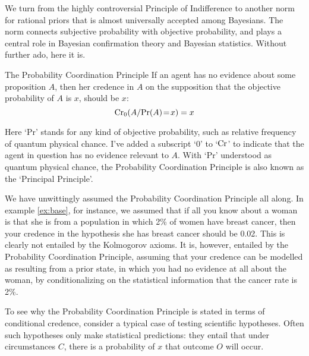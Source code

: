 
We turn from the highly controversial Principle of Indifference to
another norm for rational priors that is almost universally accepted
among Bayesians. The norm connects subjective probability with
objective probability, and plays a central role in Bayesian
confirmation theory and Bayesian statistics. Without further ado, here
it is.

\begin{genericthm}{The Probability Coordination Principle}
  If an agent has no evidence about some proposition $A$, then her
  credence in $A$ on the supposition that the objective probability of
  $A$ is $x$, should be $x$:
  \[
    \text{Cr}_0(A / \text{Pr}(A)\!=\!x) = x
  \]
\end{genericthm}
%
Here `Pr' stands for any kind of objective probability, such as
relative frequency of quantum physical chance. I've added a subscript
`0' to `$\text{Cr}$' to indicate that the agent in question has no evidence
relevant to $A$. With `Pr' understood as quantum physical chance, the
Probability Coordination Principle is also known as the `Principal
Principle'.

We have unwittingly assumed the Probability Coordination Principle all
along. In example \ref{ex:base}, for instance, we assumed that if all you
know about a woman is that she is from a population in which 2\% of
women have breast cancer, then your credence in the hypothesis she has
breast cancer should be 0.02. This is clearly not entailed by the
Kolmogorov axioms. It is, however, entailed by the Probability
Coordination Principle, assuming that your credence can be modelled as
resulting from a prior state, in which you had no evidence at all
about the woman, by conditionalizing on the statistical information
that the cancer rate is 2\%.

To see why the Probability Coordination Principle is stated in terms
of conditional credence, consider a typical case of testing scientific
hypotheses. Often such hypotheses only make statistical predictions:
they entail that under circumstances $C$, there is a probability of
$x$ that outcome $O$ will occur.

